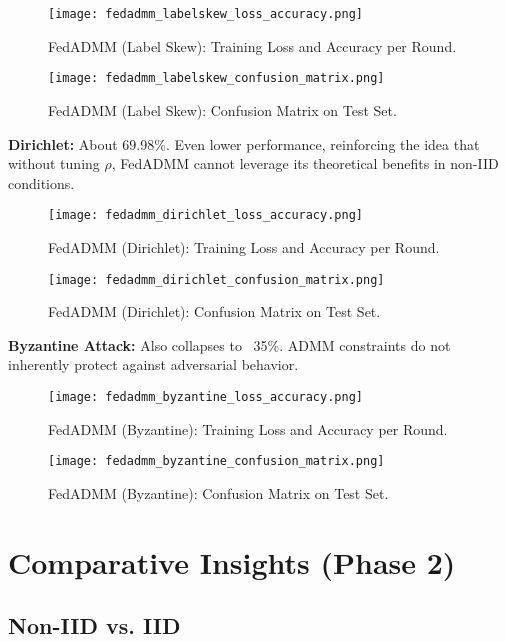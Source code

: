 \documentclass[12pt,a4paper]{report}
\begin{document}
\begin{figure}[H]
	\centering
	\texttt{[image: fedadmm\_labelskew\_loss\_accuracy.png]}
	\caption{FedADMM (Label Skew): Training Loss and Accuracy per Round.}
\end{figure}

\begin{figure}[H]
	\centering
	\texttt{[image: fedadmm\_labelskew\_confusion\_matrix.png]}
	\caption{FedADMM (Label Skew): Confusion Matrix on Test Set.}
\end{figure}

\textbf{Dirichlet:} About 69.98\%. Even lower performance, reinforcing the idea that without tuning $\rho$, FedADMM cannot leverage its theoretical benefits in non-IID conditions.

\begin{figure}[H]
	\centering
	\texttt{[image: fedadmm\_dirichlet\_loss\_accuracy.png]}
	\caption{FedADMM (Dirichlet): Training Loss and Accuracy per Round.}
\end{figure}

\begin{figure}[H]
	\centering
	\texttt{[image: fedadmm\_dirichlet\_confusion\_matrix.png]}
	\caption{FedADMM (Dirichlet): Confusion Matrix on Test Set.}
\end{figure}

\textbf{Byzantine Attack:} Also collapses to ~35\%. ADMM constraints do not inherently protect against adversarial behavior.

\begin{figure}[H]
	\centering
	\texttt{[image: fedadmm\_byzantine\_loss\_accuracy.png]}
	\caption{FedADMM (Byzantine): Training Loss and Accuracy per Round.}
\end{figure}

\begin{figure}[H]
	\centering
	\texttt{[image: fedadmm\_byzantine\_confusion\_matrix.png]}
	\caption{FedADMM (Byzantine): Confusion Matrix on Test Set.}
\end{figure}

\section{Comparative Insights (Phase 2)}

\subsection*{Non-IID vs. IID}
\end{document}
